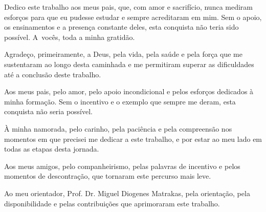 \documentclass[
    12pt,
    a4paper,
    oneside,
    chapter=TITLE,
    section=TITLE,
    subsection=TITLE,
    subsubsection=TITLE,
    sumario=tradicional,
    english,
    brazil
]{abntex2}
\begin{document}
\SingleSpacing

\pretextual

\imprimircapa

\imprimirfolhaderosto

\begin{dedicatoria}
    \vspace*{\fill}
    \begin{flushright}
        \begin{minipage}{0.5\textwidth}
            \itshape\raggedright
            Dedico este trabalho aos meus pais, que, com amor e sacrifício, nunca mediram esforços para que eu pudesse estudar e sempre acreditaram em mim. Sem o apoio, os ensinamentos e a presença constante deles, esta conquista não teria sido possível. A~vocês, toda a minha gratidão.
        \end{minipage}
    \end{flushright}
\end{dedicatoria}

\begin{agradecimentos}
Agradeço, primeiramente, a Deus, pela vida, pela saúde e pela força que me sustentaram ao longo desta caminhada e me permitiram superar as dificuldades até a conclusão deste trabalho.

Aos meus pais, pelo amor, pelo apoio incondicional e pelos esforços dedicados à minha formação. Sem o incentivo e o exemplo que sempre me deram, esta conquista não seria possível.

À minha namorada, pelo carinho, pela paciência e pela compreensão nos momentos em que precisei me dedicar a este trabalho, e por estar ao meu lado em todas as etapas desta jornada.

Aos meus amigos, pelo companheirismo, pelas palavras de incentivo e pelos momentos de descontração, que tornaram este percurso mais leve.

Ao meu orientador, Prof. Dr. Miguel Diogenes Matrakas, pela orientação, pela disponibilidade e pelas contribuições que aprimoraram este trabalho.
\end{agradecimentos}
\end{document}
